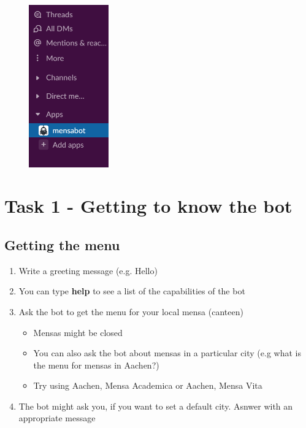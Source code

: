 \begin{figure}[h]
    \centering
    \includegraphics[height=7cm]{bot.png}
\end{figure}


      
\section*{Task 1 - Getting to know the bot}
\subsection*{Getting the menu}
\begin{enumerate}
    \item Write a greeting message (e.g. Hello)
    \item You can type \textbf{help} to see a list of the capabilities of the bot
    \item Ask the bot to get the menu for your local mensa (canteen)
    \begin{itemize}
      \item Mensas might be closed
      \item You can also ask the bot about mensas in a particular city (e.g what is the menu for mensas in Aachen?)
      \item Try using Aachen, Mensa Academica or Aachen, Mensa Vita
    \end{itemize}
    \item The bot might ask you, if you want to set a default city. Asnwer with an appropriate message
\end{enumerate}
